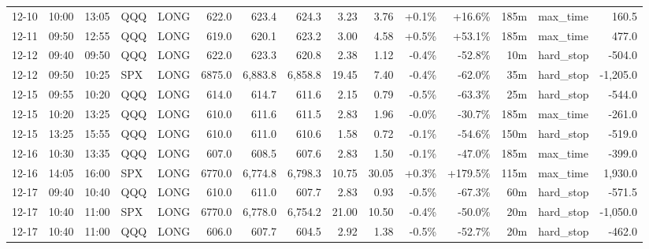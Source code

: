 \documentclass[11pt,a4paper,twoside]{article}
\begin{document}
\begin{landscape}
\begin{center}
\begin{longtable}{>{\color{txtmain}}l l l l l r r r r r r r r >{\color{txtmain}}l r}
12-10 & 10:00 & 13:05 & QQQ & LONG & 622.0 & 623.4 & 624.3 & 3.23 & 3.76 & \textcolor{wingreen}{+0.1\%} & \textcolor{wingreen}{+16.6\%} & 185m & max\_time & \textcolor{wingreen}{160.5} \\
12-11 & 09:50 & 12:55 & QQQ & LONG & 619.0 & 620.1 & 623.2 & 3.00 & 4.58 & \textcolor{wingreen}{+0.5\%} & \textcolor{wingreen}{+53.1\%} & 185m & max\_time & \textcolor{wingreen}{477.0} \\
12-12 & 09:40 & 09:50 & QQQ & LONG & 622.0 & 623.3 & 620.8 & 2.38 & 1.12 & \textcolor{lossred}{-0.4\%} & \textcolor{lossred}{-52.8\%} & 10m & hard\_stop & \textcolor{lossred}{-504.0} \\
12-12 & 09:50 & 10:25 & SPX & LONG & 6875.0 & 6,883.8 & 6,858.8 & 19.45 & 7.40 & \textcolor{lossred}{-0.4\%} & \textcolor{lossred}{-62.0\%} & 35m & hard\_stop & \textcolor{lossred}{-1,205.0} \\
12-15 & 09:55 & 10:20 & QQQ & LONG & 614.0 & 614.7 & 611.6 & 2.15 & 0.79 & \textcolor{lossred}{-0.5\%} & \textcolor{lossred}{-63.3\%} & 25m & hard\_stop & \textcolor{lossred}{-544.0} \\
12-15 & 10:20 & 13:25 & QQQ & LONG & 610.0 & 611.6 & 611.5 & 2.83 & 1.96 & \textcolor{lossred}{-0.0\%} & \textcolor{lossred}{-30.7\%} & 185m & max\_time & \textcolor{lossred}{-261.0} \\
12-15 & 13:25 & 15:55 & QQQ & LONG & 610.0 & 611.0 & 610.6 & 1.58 & 0.72 & \textcolor{lossred}{-0.1\%} & \textcolor{lossred}{-54.6\%} & 150m & hard\_stop & \textcolor{lossred}{-519.0} \\
12-16 & 10:30 & 13:35 & QQQ & LONG & 607.0 & 608.5 & 607.6 & 2.83 & 1.50 & \textcolor{lossred}{-0.1\%} & \textcolor{lossred}{-47.0\%} & 185m & max\_time & \textcolor{lossred}{-399.0} \\
12-16 & 14:05 & 16:00 & SPX & LONG & 6770.0 & 6,774.8 & 6,798.3 & 10.75 & 30.05 & \textcolor{wingreen}{+0.3\%} & \textcolor{wingreen}{+179.5\%} & 115m & max\_time & \textcolor{wingreen}{1,930.0} \\
12-17 & 09:40 & 10:40 & QQQ & LONG & 610.0 & 611.0 & 607.7 & 2.83 & 0.93 & \textcolor{lossred}{-0.5\%} & \textcolor{lossred}{-67.3\%} & 60m & hard\_stop & \textcolor{lossred}{-571.5} \\
12-17 & 10:40 & 11:00 & SPX & LONG & 6770.0 & 6,778.0 & 6,754.2 & 21.00 & 10.50 & \textcolor{lossred}{-0.4\%} & \textcolor{lossred}{-50.0\%} & 20m & hard\_stop & \textcolor{lossred}{-1,050.0} \\
12-17 & 10:40 & 11:00 & QQQ & LONG & 606.0 & 607.7 & 604.5 & 2.92 & 1.38 & \textcolor{lossred}{-0.5\%} & \textcolor{lossred}{-52.7\%} & 20m & hard\_stop & \textcolor{lossred}{-462.0} \\

\end{longtable}
\end{center}
\end{landscape}
\end{document}
